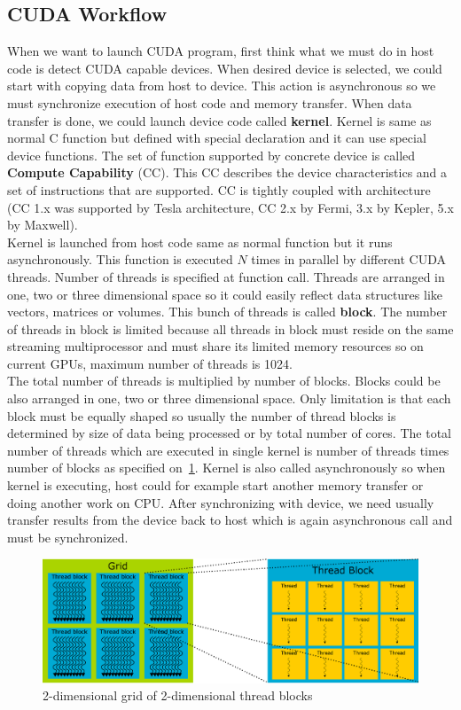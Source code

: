 \subsection{CUDA Workflow}
When we want to launch CUDA program, first think what we must do in host code is detect CUDA capable devices. When desired device is selected, we could start with copying data from host to device. This action is asynchronous so we must synchronize execution of host code and memory transfer. When data transfer is done, we could launch device code called \textbf{kernel}. Kernel is same as normal C function but defined with special declaration and it can use special device functions. The set of function supported by concrete device is called \textbf{Compute Capability} (CC). This CC describes the device characteristics and a set of instructions that are supported. CC is tightly coupled with architecture (CC 1.x was supported by Tesla architecture, CC 2.x by Fermi, 3.x by Kepler, 5.x by Maxwell).\\
Kernel is launched from host code same as normal function but it runs asynchronously. This function is executed $N$ times in parallel by different CUDA threads. Number of threads is specified at function call. Threads are arranged in one, two or three dimensional space so it could easily reflect data structures like vectors, matrices or volumes. This bunch of threads is called \textbf{block}. The number of threads in block is limited because all threads in block must reside on the same streaming multiprocessor and must share its limited memory resources so on current GPUs, maximum number of threads is 1024.\\
The total number of threads is multiplied by number of blocks. Blocks could be also arranged in one, two or three dimensional space. Only limitation is that each block must be equally shaped so usually the number of thread blocks is determined by size of data being processed or by total number of cores. The total number of threads which are executed in single kernel is number of threads times number of blocks as specified on~\ref{fig:cudagridthreadblock}. Kernel is also called asynchronously so when kernel is executing, host could for example start another memory transfer or doing another work on CPU. After synchronizing with device, we need usually transfer results from the device back to host which is again asynchronous call and must be synchronized.

\begin{figure}[h]
  \centering
  \includegraphics[width=1\linewidth]{img/CUDAthreadGridBlock.eps}
  \caption{2-dimensional grid of 2-dimensional thread blocks}
  \label{fig:cudagridthreadblock}
\end{figure}

